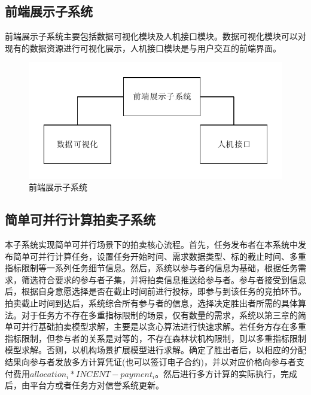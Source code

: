 \documentclass[promaster]{thesis-uestc}
\begin{document}
\subsection{前端展示子系统}
前端展示子系统主要包括数据可视化模块及人机接口模块。数据可视化模块可以对现有的数据资源进行可视化展示，人机接口模块是与用户交互的前端界面。

\begin{figure}[H]
    \includegraphics[width=350pt]{pic/qianduan.pdf}
    \caption{前端展示子系统}
\end{figure}

\subsection{简单可并行计算拍卖子系统}
本子系统实现简单可并行场景下的拍卖核心流程。首先，任务发布者在本系统中发布简单可并行计算任务，设置任务开始时间、需求数据类型、标的截止时间、多重指标限制等一系列任务细节信息。然后，系统以参与者的信息为基础，根据任务需求，筛选符合要求的参与者子集，并将拍卖信息推送给参与者。参与者接受到信息后，根据自身意愿选择是否在截止时间前进行投标，即参与到该任务的竞拍环节。拍卖截止时间到达后，系统综合所有参与者的信息，选择决定胜出者所需的具体算法。对于任务方不存在多重指标限制的场景，仅有数量的需求，系统以第三章的简单可并行基础拍卖模型求解，主要是以贪心算法进行快速求解。若任务方存在多重指标限制，但参与者的关系是对等的，不存在森林状机构限制，则以多重指标限制模型求解。否则，以机构场景扩展模型进行求解。确定了胜出者后，以相应的分配结果向参与者发放多方计算凭证(也可以签订电子合约)，并以对应价格向参与者支付费用$allocation_i*INCENT-payment_i$。然后进行多方计算的实际执行，完成后，由平台方或者任务方对信誉系统更新。
\end{document}

